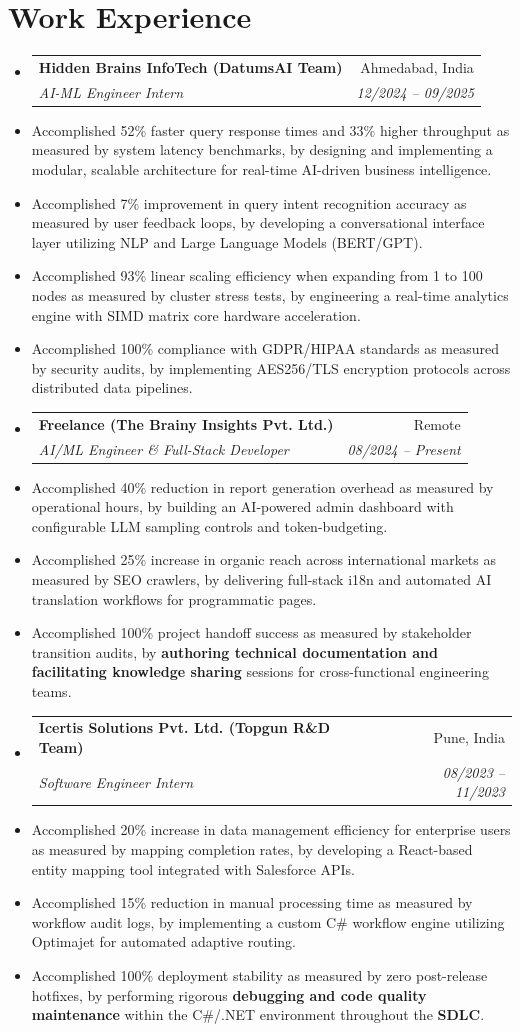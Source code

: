 \documentclass[10pt, a4paper]{article}
\makeatletter
\newcommand{\resumeItem}[1]{\item\small{#1}}
\newcommand{\resumeHeading}[4]{
  \vspace{-1pt}\item
    \begin{tabular*}{0.97\textwidth}[t]{l@{\extracolsep{\fill}}r}
      \textbf{#1} & #2 \\
      \textit{\small#3} & \textit{\small #4} \\
    \end{tabular*}\vspace{-5pt}
}
\makeatother
\begin{document}
\section{Work Experience}
\begin{itemize}[leftmargin=0.15in, label={}]

    \resumeHeading
      {Hidden Brains InfoTech (DatumsAI Team)}{Ahmedabad, India}
      {AI-ML Engineer Intern}{12/2024 -- 09/2025}
      \resumeItem{Accomplished 52\% faster query response times and 33\% higher throughput as measured by system latency benchmarks, by designing and implementing a modular, scalable architecture for real-time AI-driven business intelligence.}
      \resumeItem{Accomplished 7\% improvement in query intent recognition accuracy as measured by user feedback loops, by developing a conversational interface layer utilizing NLP and Large Language Models (BERT/GPT).}
      \resumeItem{Accomplished 93\% linear scaling efficiency when expanding from 1 to 100 nodes as measured by cluster stress tests, by engineering a real-time analytics engine with SIMD matrix core hardware acceleration.}
      \resumeItem{Accomplished 100\% compliance with GDPR/HIPAA standards as measured by security audits, by implementing AES256/TLS encryption protocols across distributed data pipelines.}

    \resumeHeading
      {Freelance (The Brainy Insights Pvt. Ltd.)}{Remote}
      {AI/ML Engineer \& Full-Stack Developer}{08/2024 -- Present}
      \resumeItem{Accomplished 40\% reduction in report generation overhead as measured by operational hours, by building an AI-powered admin dashboard with configurable LLM sampling controls and token-budgeting.}
      \resumeItem{Accomplished 25\% increase in organic reach across international markets as measured by SEO crawlers, by delivering full-stack i18n and automated AI translation workflows for programmatic pages.}
      \resumeItem{Accomplished 100\% project handoff success as measured by stakeholder transition audits, by \textbf{authoring technical documentation and facilitating knowledge sharing} sessions for cross-functional engineering teams.}

    \resumeHeading
      {Icertis Solutions Pvt. Ltd. (Topgun R\&D Team)}{Pune, India}
      {Software Engineer Intern}{08/2023 -- 11/2023}
      \resumeItem{Accomplished 20\% increase in data management efficiency for enterprise users as measured by mapping completion rates, by developing a React-based entity mapping tool integrated with Salesforce APIs.}
      \resumeItem{Accomplished 15\% reduction in manual processing time as measured by workflow audit logs, by implementing a custom C\# workflow engine utilizing Optimajet for automated adaptive routing.}
      \resumeItem{Accomplished 100\% deployment stability as measured by zero post-release hotfixes, by performing rigorous \textbf{debugging and code quality maintenance} within the C\#/.NET environment throughout the \textbf{SDLC}.}

\end{itemize}
\end{document}
